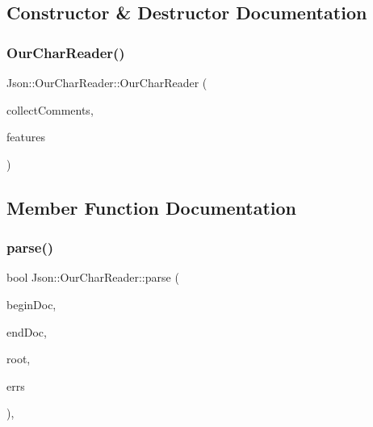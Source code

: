 \subsection{Constructor \& Destructor Documentation}
\mbox{\label{classJson_1_1OurCharReader_a5015506620e7ba7bab417756fa1ca9fe_a5015506620e7ba7bab417756fa1ca9fe}} 
\subsubsection{\texorpdfstring{Our\+Char\+Reader()}{OurCharReader()}}
{\footnotesize\ttfamily Json\+::\+Our\+Char\+Reader\+::\+Our\+Char\+Reader (\begin{DoxyParamCaption}\item[{bool}]{collect\+Comments,  }\item[{\hyperlink{classJson_1_1OurFeatures}{Our\+Features} const \&}]{features }\end{DoxyParamCaption})\hspace{0.3cm}{\ttfamily [inline]}}



\subsection{Member Function Documentation}
\mbox{\label{classJson_1_1OurCharReader_a547f08ec5a9951ca69e8bb2e90296c83_a547f08ec5a9951ca69e8bb2e90296c83}} 
\subsubsection{\texorpdfstring{parse()}{parse()}}
{\footnotesize\ttfamily bool Json\+::\+Our\+Char\+Reader\+::parse (\begin{DoxyParamCaption}\item[{char const $\ast$}]{begin\+Doc,  }\item[{char const $\ast$}]{end\+Doc,  }\item[{\hyperlink{classJson_1_1Value}{Value} $\ast$}]{root,  }\item[{\hyperlink{json_8h_a1e723f95759de062585bc4a8fd3fa4be_a1e723f95759de062585bc4a8fd3fa4be}{J\+S\+O\+N\+C\+P\+P\+\_\+\+S\+T\+R\+I\+NG} $\ast$}]{errs }\end{DoxyParamCaption})\hspace{0.3cm}{\ttfamily [inline]}, {\ttfamily [virtual]}}



